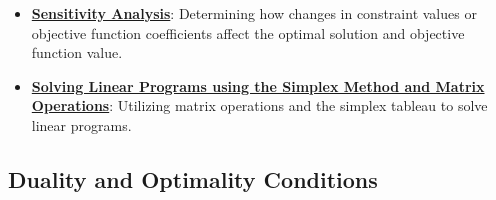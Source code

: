 \documentclass{article}%
\begin{document}
\begin{itemize}[leftmargin=*]
\item \href{https://www.math.purdue.edu/~yipn/421//2024-10-01-SensitivityDuality.pdf#page=7}{\textbf{Sensitivity Analysis}}: Determining how changes in constraint values or objective function coefficients affect the optimal solution and objective function value.%
\item \href{https://www.math.purdue.edu/~yipn/421//2024-10-01-SensitivityDuality.pdf#page=4}{\textbf{Solving Linear Programs using the Simplex Method and Matrix Operations}}: Utilizing matrix operations and the simplex tableau to solve linear programs.%
\end{itemize}

%
\subsection{Duality and Optimality Conditions}%
\label{subsec:DualityandOptimalityConditions}%
\end{document}
